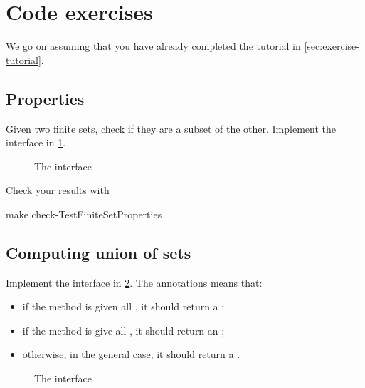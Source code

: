 

\section{Code exercises}

We go on assuming that you have already completed the tutorial in \cref{sec:exercise-tutorial}.

\subsection{Properties}

\begin{gradedexercise}
  Given two finite sets, check if they are a subset of the other.
  Implement the interface in \cref{fig:FiniteSetProperties}.

\end{gradedexercise}

\begin{figure}
\caption{The  interface}
\label{fig:FiniteSetProperties}
\end{figure}

Check your results with

\begin{console}
 make check-TestFiniteSetProperties
\end{console}

\subsection{Computing union of sets}


\begin{gradedexercise}
  Implement the interface in \cref{fig:MakeSetUnion}.
  The  annotations means that:
   \begin{itemize}
   \item if the method is given all \FiniteSet, it should return a \FiniteSet;
    \item if the method is give all \EnumerableSet, it should return an \EnumerableSet;
    \item otherwise, in the general case, it should return a \Setoid.
    \end{itemize}
\end{gradedexercise}


\begin{figure}
\caption{The  interface}
\label{fig:MakeSetUnion}
\end{figure}

